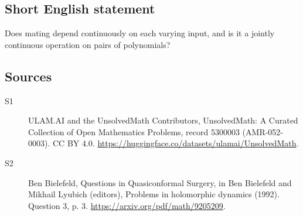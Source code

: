 \documentclass[11pt]{article}
\begin{document}
\subsection{Short English statement}
Does mating depend continuously on each varying input, and is it a jointly continuous operation on pairs of polynomials?
\subsection{Sources}
\begin{description}
\item[\hypertarget{source:5300003:1}{S1}] ULAM.AI and the UnsolvedMath Contributors, UnsolvedMath: A Curated Collection of Open Mathematics Problems, record 5300003 (AMR-052-0003). CC BY 4.0. \url{https://huggingface.co/datasets/ulamai/UnsolvedMath}.
\item[\hypertarget{source:5300003:2}{S2}] Ben Bielefeld, Questions in Quasiconformal Surgery, in Ben Bielefeld and Mikhail Lyubich (editors), Problems in holomorphic dynamics (1992). Question 3, p. 3. \url{https://arxiv.org/pdf/math/9205209}.
\end{description}
\label{end:5300003}
\end{document}
